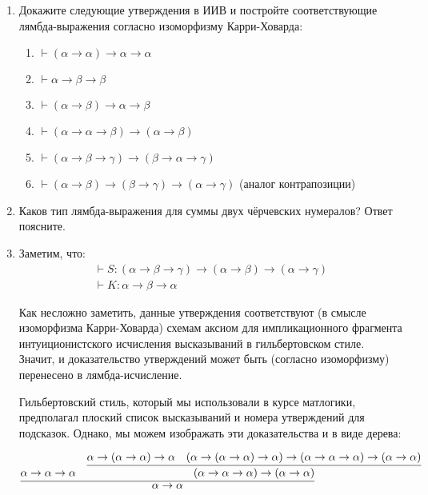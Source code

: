 \documentclass[10pt,a4paper,oneside]{article}
\begin{document}
\begin{enumerate}
\item Докажите следующие утверждения в ИИВ и постройте соответствующие лямбда-выражения
согласно изоморфизму Карри-Ховарда:
\begin{enumerate}
\item $\vdash(\alpha\rightarrow\alpha)\rightarrow\alpha\rightarrow\alpha$
\item $\vdash\alpha\rightarrow\beta\rightarrow\beta$
\item $\vdash(\alpha\rightarrow\beta)\rightarrow\alpha\rightarrow\beta$
\item $\vdash(\alpha\rightarrow\alpha\rightarrow\beta)\rightarrow(\alpha\rightarrow\beta)$
\item $\vdash(\alpha\rightarrow\beta\rightarrow\gamma)\rightarrow(\beta\rightarrow\alpha\rightarrow\gamma)$
\item $\vdash(\alpha\rightarrow\beta)\rightarrow(\beta\rightarrow\gamma)\rightarrow(\alpha\rightarrow\gamma)$
(аналог контрапозиции)
\end{enumerate}

\item Каков тип лямбда-выражения для суммы двух чёрчевских нумералов? Ответ поясните.

\item Заметим, что:
$$\begin{array}{l}
\vdash S : (\alpha\rightarrow\beta\rightarrow\gamma)\rightarrow(\alpha\rightarrow\beta)\rightarrow(\alpha\rightarrow\gamma)\\
\vdash K : \alpha\rightarrow\beta\rightarrow\alpha\end{array}$$

Как несложно заметить, данные утверждения соответствуют (в смысле изоморфизма Карри-Ховарда) 
схемам аксиом для импликационного фрагмента интуиционистского исчисления высказываний в гильбертовском стиле.
Значит, и доказательство утверждений может быть (согласно изоморфизму) перенесено в лямбда-исчисление.

Гильбертовский стиль, который мы использовали в курсе матлогики, предполагал плоский список высказываний
и номера утверждений для подсказок.
Однако, мы можем изображать эти доказательства и в виде дерева:


$$\infer{\alpha\rightarrow\alpha}
{\alpha\rightarrow\alpha\rightarrow\alpha &
   \infer{(\alpha\rightarrow\alpha\rightarrow\alpha)\rightarrow(\alpha\rightarrow\alpha)}
         { \alpha\rightarrow(\alpha\rightarrow\alpha)\rightarrow\alpha &
          (\alpha\rightarrow(\alpha\rightarrow\alpha)\rightarrow\alpha)\rightarrow(\alpha\rightarrow\alpha\rightarrow\alpha)\rightarrow(\alpha\rightarrow\alpha)
         }
}$$


\end{enumerate}
\end{document}
